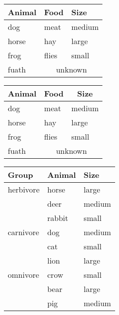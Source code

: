 \documentclass{article}
\begin{document}
\newpage




\begin{tabular}{lll}
  \toprule
  Animal & Food  & Size   \\
  \midrule
  dog    & meat  & medium \\
  horse  & hay   & large  \\
  frog   & flies & small  \\
  fuath  & \multicolumn{2}{c}{unknown} \\
  \bottomrule
\end{tabular}


\newpage


\begin{tabular}{lll}
  \toprule
  \multicolumn{1}{c}{Animal} & \multicolumn{1}{c}{Food} & \multicolumn{1}{c}{Size} \\
  \midrule
  dog    & meat  & medium \\
  horse  & hay   & large  \\
  frog   & flies & small  \\
  fuath  & \multicolumn{2}{c}{unknown} \\
  \bottomrule
\end{tabular}

\newpage


\begin{tabular}{lll}
  \toprule
  Group     & Animal & Size   \\
  \midrule
  herbivore & horse  & large  \\
            & deer   & medium \\
            & rabbit & small  \\
  \addlinespace
  carnivore & dog    & medium \\
            & cat    & small  \\
            & lion   & large  \\
  \addlinespace
  omnivore  & crow   & small  \\
            & bear   & large  \\
            & pig    & medium \\
  \bottomrule
\end{tabular}
\end{document}
